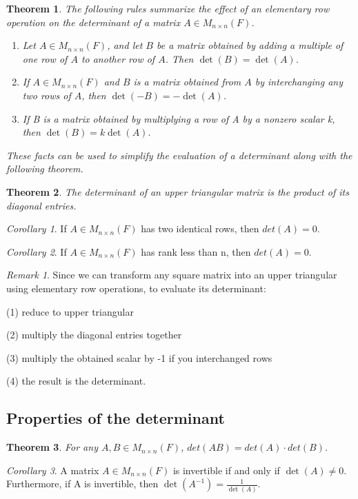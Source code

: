 \documentclass[12pt]{article}
\newtheorem{theorem}{Theorem}[section]
\theoremstyle{definition}
\theoremstyle{remark}
\newtheorem*{remark}{Remark}
\newtheorem{corollary}{Corollary}[theorem]
\begin{document}
\begin{theorem} 
    The following rules summarize the effect of an elementary row operation on the determinant of a matrix $A \in M_{n \times n} (F)$. 
    \begin{enumerate}
        \item Let $A \in M_{n\times n}(F)$, and let $B$ be a matrix obtained by adding a multiple of one row of $A$
        to another row of $A$. Then $\det(B) = \det(A)$.
        \item If $A \in M_{n\times n}(F)$ and $B$ is a matrix obtained from $A$ by
        interchanging any two rows of $A$, then $\det(-B) = - \det(A)$. 
        \item If B is a matrix obtained by multiplying a row of A by a nonzero scalar k, then $\det(B) = k \det(A)$.
    \end{enumerate}
    These facts can be used to simplify the evaluation of a determinant along with the following theorem.
\end{theorem}
\begin{theorem}
    The determinant of an upper triangular matrix is the product of its diagonal entries.
\end{theorem}
\begin{corollary}
    If $A \in M_{n\times n}(F)$ has two identical rows, then $det(A) = 0$.
\end{corollary}
\begin{corollary}
    If $A \in M_{n \times n} (F)$ has rank less than n, then $det(A) = 0$.
\end{corollary}

\begin{remark}
    Since we can transform any square matrix into an upper triangular using elementary row operations, to evaluate its determinant:
    
    (1) reduce to upper triangular 

    (2) multiply the diagonal entries together

    (3) multiply the obtained scalar by -1 if you interchanged rows

    (4) the result is the determinant.
\end{remark}

\subsection{Properties of the determinant}
\begin{theorem}
    For any $A,B \in M_{n \times n}(F)$, $det(AB) = det(A)\cdot det(B)$.
\end{theorem}
\begin{corollary}
    A matrix $A \in M_{n\times n} (F)$ is invertible if and only if $\det (A) \neq 0 $. Furthermore, 
    if A is invertible, then $\det(A^{-1}) = \frac{1}{\det(A)}$.
\end{corollary}
\end{document}
